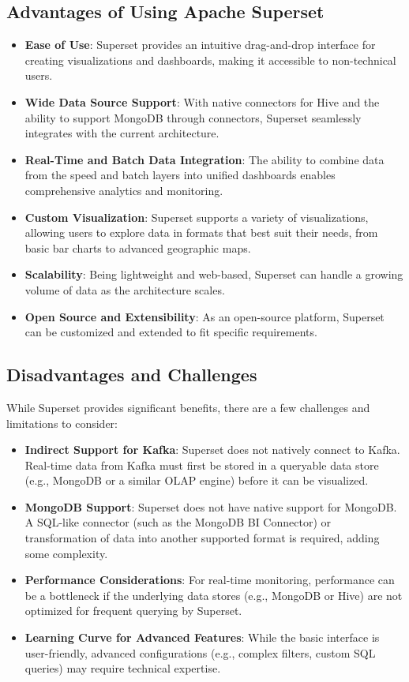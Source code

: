 \documentclass[12pt,a4paper, hidelinks]{article}
\begin{document}
\subsection{Advantages of Using Apache Superset}
\begin{itemize}
    \item \textbf{Ease of Use}: Superset provides an intuitive drag-and-drop interface for creating visualizations and dashboards, making it accessible to non-technical users.
    \item \textbf{Wide Data Source Support}: With native connectors for Hive and the ability to support MongoDB through connectors, Superset seamlessly integrates with the current architecture.
    \item \textbf{Real-Time and Batch Data Integration}: The ability to combine data from the speed and batch layers into unified dashboards enables comprehensive analytics and monitoring.
    \item \textbf{Custom Visualization}: Superset supports a variety of visualizations, allowing users to explore data in formats that best suit their needs, from basic bar charts to advanced geographic maps.
    \item \textbf{Scalability}: Being lightweight and web-based, Superset can handle a growing volume of data as the architecture scales.
    \item \textbf{Open Source and Extensibility}: As an open-source platform, Superset can be customized and extended to fit specific requirements.
\end{itemize}

\subsection{Disadvantages and Challenges}
While Superset provides significant benefits, there are a few challenges and limitations to consider:
\begin{itemize}
    \item \textbf{Indirect Support for Kafka}: Superset does not natively connect to Kafka. Real-time data from Kafka must first be stored in a queryable data store (e.g., MongoDB or a similar OLAP engine) before it can be visualized.
    \item \textbf{MongoDB Support}: Superset does not have native support for MongoDB. A SQL-like connector (such as the MongoDB BI Connector) or transformation of data into another supported format is required, adding some complexity.
    \item \textbf{Performance Considerations}: For real-time monitoring, performance can be a bottleneck if the underlying data stores (e.g., MongoDB or Hive) are not optimized for frequent querying by Superset.
    \item \textbf{Learning Curve for Advanced Features}: While the basic interface is user-friendly, advanced configurations (e.g., complex filters, custom SQL queries) may require technical expertise.
\end{itemize}
\end{document}
